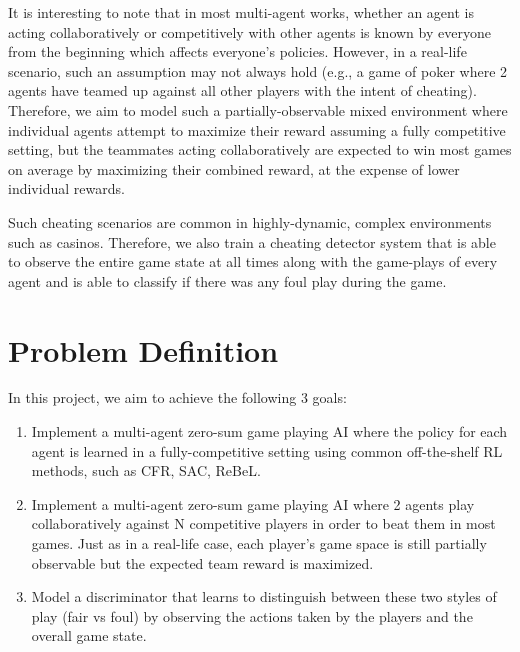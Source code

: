 \documentclass{article}
\begin{document}
It is interesting to note that in most multi-agent works, whether an agent is acting collaboratively or competitively with other agents is known by everyone from the beginning which affects everyone's policies. However, in a real-life scenario, such an assumption may not always hold (e.g., a game of poker where 2 agents have teamed up against all other players with the intent of cheating). Therefore, we aim to model such a partially-observable mixed environment where individual agents attempt to maximize their reward assuming a fully competitive setting, but the teammates acting collaboratively are expected to win most games on average by maximizing their combined reward, at the expense of lower individual rewards. 

Such cheating scenarios are common in highly-dynamic, complex environments such as casinos. Therefore, we also train a cheating detector system that is able to observe the entire game state at all times along with the game-plays of every agent and is able to classify if there was any foul play during the game. 

\section{Problem Definition}

In this project, we aim to achieve the following 3 goals:

\begin{enumerate}
    \item Implement a multi-agent zero-sum game playing AI where the policy for each agent is learned in a fully-competitive setting using common off-the-shelf RL methods, such as CFR, SAC, ReBeL.

    \item Implement a multi-agent zero-sum game playing AI where 2 agents play collaboratively against N competitive players in order to beat them in most games. Just as in a real-life case, each player's game space is still partially observable but the expected team reward is maximized.

    \item Model a discriminator that learns to distinguish between these two styles of play (fair vs foul) by observing the actions taken by the players and the overall game state. 
\end{enumerate}
\end{document}
